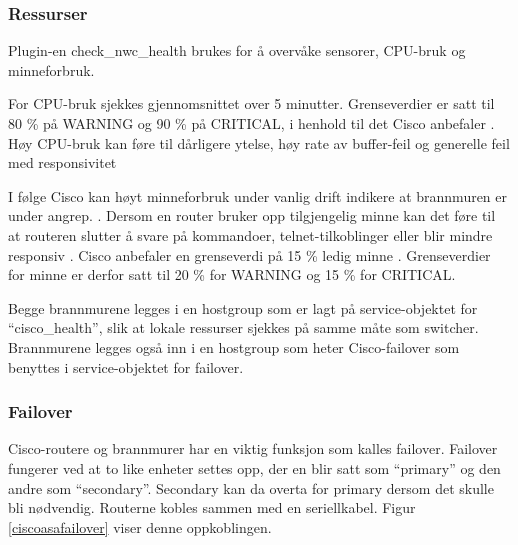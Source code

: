 \subsubsection{Ressurser}
Plugin-en check\_nwc\_health brukes for å overvåke sensorer, CPU-bruk og minneforbruk.

For CPU-bruk sjekkes gjennomsnittet over 5 minutter. Grenseverdier er satt til 80 \% på WARNING og 90 \% på CRITICAL, i henhold til det Cisco anbefaler \cite{ciscounifiedcommunication}. Høy CPU-bruk kan føre til dårligere ytelse, høy rate av buffer-feil og generelle feil med responsivitet \cite{ciscocpurouters}

I følge Cisco kan høyt minneforbruk under vanlig drift indikere at brannmuren er under angrep. \cite{ciscomem}. Dersom en router bruker opp tilgjengelig minne kan det føre til at routeren slutter å svare på kommandoer, telnet-tilkoblinger eller blir mindre responsiv \cite{ciscomemproblem}. Cisco anbefaler en grenseverdi på 15 \% ledig minne \cite{ciscounifiedcommunication}. Grenseverdier for minne er derfor satt til 20 \% for WARNING og 15 \% for CRITICAL.

Begge brannmurene legges i en hostgroup som er lagt på service-objektet for ``cisco\_health'', slik at lokale ressurser sjekkes på samme måte som switcher. Brannmurene legges også inn i en hostgroup som heter Cisco-failover som benyttes i service-objektet for failover.

\subsubsection{Failover}
Cisco-routere og brannmurer har en viktig funksjon som kalles failover. Failover fungerer ved at to like enheter settes opp, der en blir satt som ``primary'' og den andre som ``secondary''. Secondary kan da overta for primary dersom det skulle bli nødvendig. Routerne kobles sammen med en seriellkabel. Figur \ref{ciscoasafailover} viser denne oppkoblingen. 

